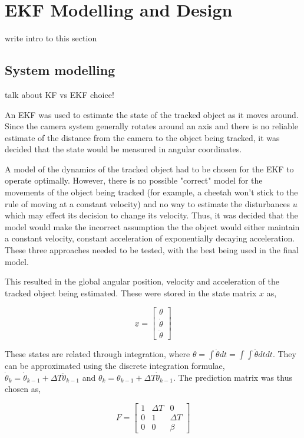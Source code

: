 \chapter{EKF Modelling and Design}

{\Large \color{red} write intro to this section}

\section{System modelling}
{\color{red} talk about KF vs EKF choice!}

An EKF was used to estimate the state of the tracked object as it moves around. Since the camera system generally rotates around an axis and there is no reliable estimate of the distance from the camera to the object being tracked, it was decided that the state would be measured in angular coordinates.

A model of the dynamics of the tracked object had to be chosen for the EKF to operate optimally. However, there is no possible "correct" model for the movements of the object being tracked (for example, a cheetah won't stick to the rule of moving at a constant velocity) and no way to estimate the disturbances $u$ which may effect its decision to change its velocity. Thus, it was decided that the model would make the incorrect assumption the the object would either maintain a constant velocity, constant acceleration of exponentially decaying acceleration. These three approaches needed to be tested, with the best being used in the final model.

This resulted in the global angular position, velocity and acceleration of the tracked object being estimated. These were stored in the state matrix $x$ as,

\[ \underline{x} = \begin{bmatrix} \theta \\ \dot{\theta} \\ \ddot{\theta} \end{bmatrix} \]

These states are related through integration, where $\theta = \int{\dot{\theta} dt} = \int{\int{\ddot{\theta} dt}dt}$. They can be approximated using the discrete integration formulae, $\dot{\theta}_k = \dot{\theta}_{k-1} + \Delta T \ddot{\theta}_{k-1}$ and $\theta_k = \theta_{k-1} + \Delta T \dot{\theta}_{k-1}$. The prediction matrix was thus chosen as,

\[ F = \begin{bmatrix} 1 & \Delta T & 0 \\
                       0 & 1 & \Delta T \\
					   0 & 0 & \beta
		\end{bmatrix} \]

